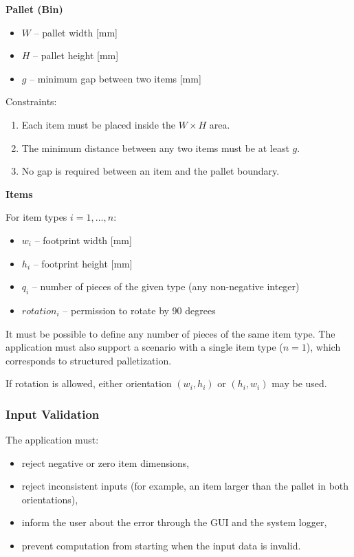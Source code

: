\documentclass[12pt,a4paper]{article}
\begin{document}
\textbf{Pallet (Bin)}

\begin{itemize}
    \item $W$ -- pallet width [mm]
    \item $H$ -- pallet height [mm]
    \item $g$ -- minimum gap between two items [mm]
\end{itemize}

Constraints:

\begin{enumerate}
    \item Each item must be placed inside the $W \times H$ area.
    \item The minimum distance between any two items must be at least $g$.
    \item No gap is required between an item and the pallet boundary.
\end{enumerate}

\textbf{Items}

For item types $i = 1, \dots, n$:

\begin{itemize}
    \item $w_i$ -- footprint width [mm]
    \item $h_i$ -- footprint height [mm]
    \item $q_i$ -- number of pieces of the given type (any non-negative integer)
    \item $rotation_i$ -- permission to rotate by 90 degrees
\end{itemize}

It must be possible to define any number of pieces of the same item type. The application must also support a scenario with a single item type ($n = 1$), which corresponds to structured palletization.

If rotation is allowed, either orientation $(w_i, h_i)$ or $(h_i, w_i)$ may be used.

\subsubsection*{Input Validation}

The application must:

\begin{itemize}
    \item reject negative or zero item dimensions,
    \item reject inconsistent inputs (for example, an item larger than the pallet
    in both orientations),
    \item inform the user about the error through the GUI
    and the system logger,
    \item prevent computation from starting when the input data is invalid.
\end{itemize}
\end{document}

